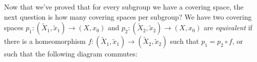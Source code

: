 \orbreak
Now that we've proved that for every subgroup we have a covering space, the next question is how many covering spaces per subgroup? We have two covering spaces $p_1 \colon (\widetilde X_1,\widetilde x_1)\to (X,x_0) $ and $p_2 \colon (\widetilde X_2,\widetilde x_2) \to (X,x_0)$ are \emph{equivalent} if there is a homeomorphism $f \colon (\widetilde X_1,\widetilde x_1) \to (\widetilde X_2,\widetilde x_2)$ such that $p_1=p_2\circ f$, or such that the following diagram commutes:
            \begin{figure}[H]
                \centering
            \end{figure}

